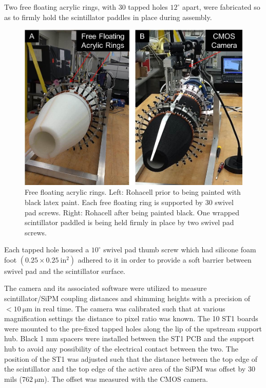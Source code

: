 Two free floating acrylic rings, with 30 tapped holes $12^{\circ}$ apart, were fabricated so as to firmly hold the scintillator paddles in place during assembly. 
	\begin{figure}[!htb]
		\centering
		\includegraphics[width=1.0\columnwidth]{fabrication/figs/st_assembly}
		\caption{Free floating acrylic rings.  Left: Rohacell prior to being painted with black latex paint. Each free floating ring is supported by 30 swivel pad screws. Right: Rohacell after being painted black.  One wrapped scintillator paddled is being held firmly in place by two swivel pad screws.}
		\label{fig:free_floating_rings}
	\end{figure}
Each tapped hole housed a $10^{\circ}$ swivel pad thumb screw which had silicone foam foot $(0.25 \times 0.25\ \mathrm{in^{2}})$ adhered to it in order to provide a soft barrier between swivel pad and the scintillator surface. 

The camera and its associated software were utilized to measure scintillator/SiPM coupling distances and shimming heights with a precision of $\mathrm{< 10\ \mu m}$ in real time.  The camera was calibrated such that at various magnification settings the distance to pixel ratio was known.  The 10 ST1 boards were mounted to the pre-fixed tapped holes along the lip of the upstream support hub.  Black 1 mm spacers were installed between the ST1 PCB and the support hub to avoid any possibility of the electrical contact between the two.  The position of the ST1 was adjusted such that the distance between the top edge of the scintillator and the top edge of the active area of the SiPM was offset by 30 mils ($\mathrm{762\ \mu m}$).  The offset was measured with the CMOS camera. 

